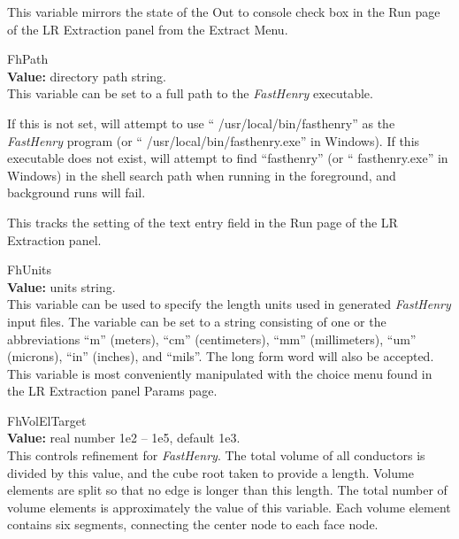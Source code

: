 \begin{description}
This variable mirrors the state of the {\cb Out to console} check box
in the {\cb Run} page of the {\cb LR Extraction} panel from the
{\cb Extract Menu}.

\item{\et FhPath}\\
{\bf Value:} directory path string.\\
This variable can be set to a full path to the {\it FastHenry} executable.

If this is not set, {\Xic} will attempt to use ``{\vt
/usr/local/bin/fasthenry}'' as the {\it FastHenry} program (or ``{\vt
/usr/local/bin/fasthenry.exe}'' in Windows).  If this executable does
not exist, {\Xic} will attempt to find ``{\vt fasthenry}'' (or ``{\vt
fasthenry.exe}'' in Windows) in the shell search path when running in
the foreground, and background runs will fail.

This tracks the setting of the text entry field in the {\cb Run} page
of the {\cb LR Extraction} panel.

\item{\et FhUnits}\\
{\bf Value:} units string.\\
This variable can be used to specify the length units used in
generated {\it FastHenry} input files.  The variable can be set to a
string consisting of one or the abbreviations ``{\vt m}'' (meters),
``{\vt cm}'' (centimeters), ``{\vt mm}'' (millimeters), ``{\vt um}''
(microns), ``{\vt in}'' (inches), and ``{\vt mils}''.  The long form
word will also be accepted.  This variable is most conveniently
manipulated with the choice menu found in the {\cb LR Extraction}
panel {\cb Params} page.

\item{\et FhVolElTarget}\\
{\bf Value:} real number 1e2 -- 1e5, default 1e3.\\
This controls refinement for {\it FastHenry}.  The total volume of all
conductors is divided by this value, and the cube root taken to
provide a length.  Volume elements are split so that no edge is longer
than this length.  The total number of volume elements is
approximately the value of this variable.  Each volume element
contains six segments, connecting the center node to each face node.
\end{description}


